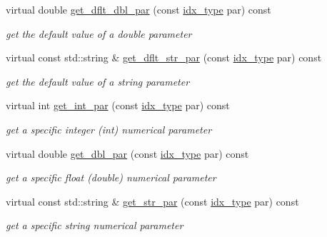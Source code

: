 \begin{Indent}
\begin{DoxyCompactItemize}
virtual double \mbox{\hyperlink{class_s_m_spp__di__unipi__it_1_1_thin_compute_interface_ae2d249f431892cbf41ccf19204b78228}{get\+\_\+dflt\+\_\+dbl\+\_\+par}} (const \mbox{\hyperlink{class_s_m_spp__di__unipi__it_1_1_thin_compute_interface_aa3d710629ad8c434286726ad810c3b47}{idx\+\_\+type}} par) const
\begin{DoxyCompactList}\small\item\em get the default value of a double parameter \end{DoxyCompactList}\item 
virtual const std\+::string \& \mbox{\hyperlink{class_s_m_spp__di__unipi__it_1_1_thin_compute_interface_a0b058687744cfc2e91a20187c56566ca}{get\+\_\+dflt\+\_\+str\+\_\+par}} (const \mbox{\hyperlink{class_s_m_spp__di__unipi__it_1_1_thin_compute_interface_aa3d710629ad8c434286726ad810c3b47}{idx\+\_\+type}} par) const
\begin{DoxyCompactList}\small\item\em get the default value of a string parameter \end{DoxyCompactList}\item 
virtual int \mbox{\hyperlink{class_s_m_spp__di__unipi__it_1_1_thin_compute_interface_a9403da6fd83a275dfdf21ec4db71c744}{get\+\_\+int\+\_\+par}} (const \mbox{\hyperlink{class_s_m_spp__di__unipi__it_1_1_thin_compute_interface_aa3d710629ad8c434286726ad810c3b47}{idx\+\_\+type}} par) const
\begin{DoxyCompactList}\small\item\em get a specific integer (int) numerical parameter \end{DoxyCompactList}\item 
virtual double \mbox{\hyperlink{class_s_m_spp__di__unipi__it_1_1_thin_compute_interface_a16a600de08446b386bc437d8448ef44a}{get\+\_\+dbl\+\_\+par}} (const \mbox{\hyperlink{class_s_m_spp__di__unipi__it_1_1_thin_compute_interface_aa3d710629ad8c434286726ad810c3b47}{idx\+\_\+type}} par) const
\begin{DoxyCompactList}\small\item\em get a specific float (double) numerical parameter \end{DoxyCompactList}\item 
virtual const std\+::string \& \mbox{\hyperlink{class_s_m_spp__di__unipi__it_1_1_thin_compute_interface_abdd41940763ebff749e5f16e6ea310c6}{get\+\_\+str\+\_\+par}} (const \mbox{\hyperlink{class_s_m_spp__di__unipi__it_1_1_thin_compute_interface_aa3d710629ad8c434286726ad810c3b47}{idx\+\_\+type}} par) const
\begin{DoxyCompactList}\small\item\em get a specific string numerical parameter \end{DoxyCompactList}\item 

\end{DoxyCompactItemize}
\end{Indent}
